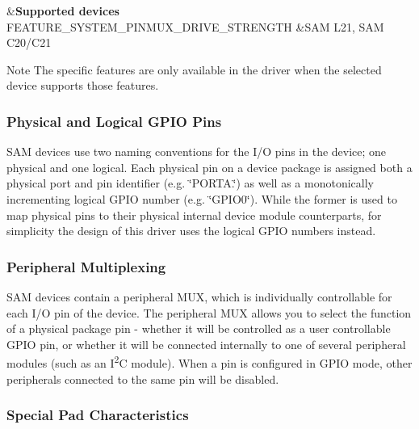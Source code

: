 \begin{TabularC}{2}
\hline
{}&{\bf Supported devices  }\\
F\+E\+A\+T\+U\+R\+E\+\_\+\+S\+Y\+S\+T\+E\+M\+\_\+\+P\+I\+N\+M\+U\+X\+\_\+\+D\+R\+I\+V\+E\+\_\+\+S\+T\+R\+E\+N\+G\+T\+H &S\+A\+M L21, S\+A\+M C20/\+C21  \\
\end{TabularC}
\begin{DoxyNote}{Note}
The specific features are only available in the driver when the selected device supports those features.
\end{DoxyNote}
\hypertarget{group__asfdoc__sam0__system__pinmux__group_asfdoc_sam0_system_pinmux_physical_logical_pins}{}\subsubsection{Physical and Logical G\+P\+I\+O Pins}\label{group__asfdoc__sam0__system__pinmux__group_asfdoc_sam0_system_pinmux_physical_logical_pins}
S\+A\+M devices use two naming conventions for the I/\+O pins in the device; one physical and one logical. Each physical pin on a device package is assigned both a physical port and pin identifier (e.\+g. \char`\"{}\+P\+O\+R\+T\+A.\char`\"{}) as well as a monotonically incrementing logical G\+P\+I\+O number (e.\+g. \char`\"{}\+G\+P\+I\+O0\char`\"{}). While the former is used to map physical pins to their physical internal device module counterparts, for simplicity the design of this driver uses the logical G\+P\+I\+O numbers instead.\hypertarget{group__asfdoc__sam0__system__pinmux__group_asfdoc_sam0_system_pinmux_peripheral_muxing}{}\subsubsection{Peripheral Multiplexing}\label{group__asfdoc__sam0__system__pinmux__group_asfdoc_sam0_system_pinmux_peripheral_muxing}
S\+A\+M devices contain a peripheral M\+U\+X, which is individually controllable for each I/\+O pin of the device. The peripheral M\+U\+X allows you to select the function of a physical package pin -\/ whether it will be controlled as a user controllable G\+P\+I\+O pin, or whether it will be connected internally to one of several peripheral modules (such as an I\textsuperscript{2}C module). When a pin is configured in G\+P\+I\+O mode, other peripherals connected to the same pin will be disabled.\hypertarget{group__asfdoc__sam0__system__pinmux__group_asfdoc_sam0_system_pinmux_pad_characteristics}{}\subsubsection{Special Pad Characteristics}\label{group__asfdoc__sam0__system__pinmux__group_asfdoc_sam0_system_pinmux_pad_characteristics}
